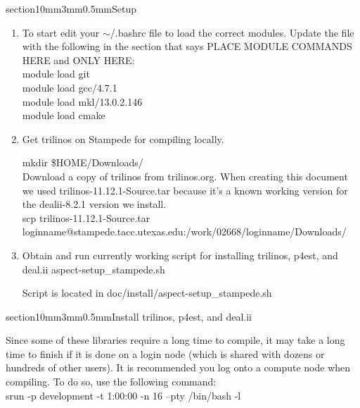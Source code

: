 \documentclass[11pt]{article}
\makeatletter
\renewcommand{\section}{\@startsection
  {section}{1}{0mm}{3mm}{0.5mm}{\bfseries\large}}
\makeatother
\begin{document}
\section{Setup}
\begin{enumerate}
\item To start edit your $\sim$/.bashrc file to load the correct modules. Update the file with the following in the 
section that says PLACE MODULE COMMANDS HERE and ONLY HERE: \\

  module load git \\
  module load gcc/4.7.1 \\
  module load mkl/13.0.2.146 \\
  module load cmake \\


\item Get trilinos on Stampede for compiling locally. 

mkdir \$HOME/Downloads/ \\
Download a copy of trilinos from trilinos.org. When creating this document we used 
 trilinos-11.12.1-Source.tar because it's a known working version for the dealii-8.2.1 
 version we install. \\
 
 scp trilinos-11.12.1-Source.tar  loginname@stampede.tacc.utexas.edu:/work/02668/loginname/Downloads/  \\
 
 \item Obtain and run currently working script for installing trilinos, p4est, and deal.ii  aspect-setup\_stampede.sh 
 
 
Script is located in doc/install/aspect-setup\_stampede.sh \\
 
 \end{enumerate}

 \section{Install trilinos, p4est, and deal.ii}
 
Since some of these libraries require a long time to compile, it may take a long time to
finish if it is done on a login node (which is shared with dozens or hundreds of other users).
It is recommended you log onto a compute node when compiling. To do so, use the following
command: \\

srun -p development -t 1:00:00 -n 16 --pty /bin/bash -l \\
\end{document}
